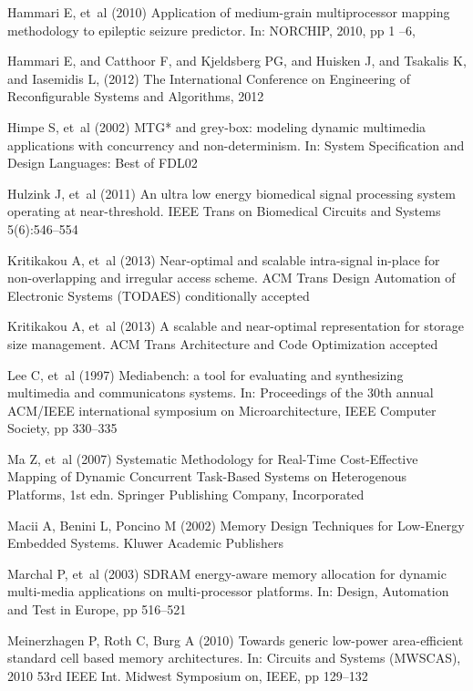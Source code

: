 \documentclass[smallcondensed]{svjour3}
\begin{document}
\begin{thebibliography}{40}
Hammari E, et~al (2010) Application of medium-grain multiprocessor mapping
  methodology to epileptic seizure predictor. In: NORCHIP, 2010, pp 1 --6,
  
Hammari E, and Catthoor F, and Kjeldsberg PG, and Huisken J, and Tsakalis K, and Iasemidis L, (2012) The International Conference on Engineering of Reconfigurable Systems and Algorithms, 2012 

Himpe S, et~al (2002) {M}{T}{G}* and grey-box: modeling dynamic multimedia
  applications with concurrency and non-determinism. In: System Specification
  and Design Languages: Best of FDL02

Hulzink J, et~al (2011) An ultra low energy biomedical signal processing system
  operating at near-threshold. IEEE Trans on Biomedical Circuits and Systems
  5(6):546--554

Kritikakou A, et~al (2013{}) Near-optimal and scalable intra-signal
  in-place for non-overlapping and irregular access scheme. ACM Trans Design
  Automation of Electronic Systems (TODAES) conditionally accepted

Kritikakou A, et~al (2013{}) A scalable and near-optimal
  representation for storage size management. ACM Trans Architecture and Code
  Optimization accepted

Lee C, et~al (1997) Mediabench: a tool for evaluating and synthesizing
  multimedia and communicatons systems. In: Proceedings of the 30th annual
  ACM/IEEE international symposium on Microarchitecture, IEEE Computer Society,
  pp 330--335

Ma Z, et~al (2007) Systematic Methodology for Real-Time Cost-Effective Mapping
  of Dynamic Concurrent Task-Based Systems on Heterogenous Platforms, 1st edn.
  Springer Publishing Company, Incorporated

Macii A, Benini L, Poncino M (2002) Memory Design Techniques for Low-Energy
  Embedded Systems. Kluwer Academic Publishers

Marchal P, et~al (2003) {S}{D}{R}{A}{M} energy-aware memory allocation for
  dynamic multi-media applications on multi-processor platforms. In: Design,
  Automation and Test in Europe, pp 516--521

Meinerzhagen P, Roth C, Burg A (2010) Towards generic low-power area-efficient
  standard cell based memory architectures. In: Circuits and Systems (MWSCAS),
  2010 53rd IEEE Int. Midwest Symposium on, IEEE, pp 129--132


\end{thebibliography}
\end{document}
